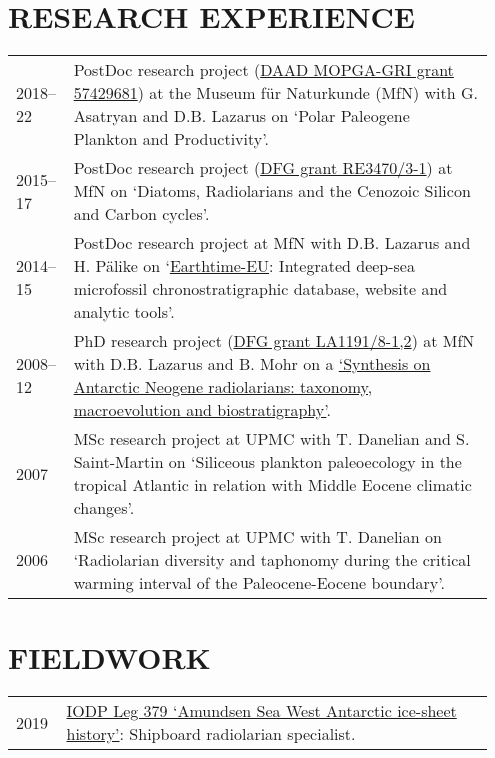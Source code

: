 \documentclass[11pt, a4paper]{article}
\begin{document}
\section{RESEARCH EXPERIENCE}
\begin{longtable}{@{}p{0.1\linewidth} P{0.85\linewidth}@{}}
2018--22 & PostDoc research project (\href{https://www.daad.de/medien/hochschulen/regional/europa/mopga/projektbeschreibungen_englisch_15-05-2018.pdf}{DAAD MOPGA-GRI grant 57429681}) at the Museum f\"{u}r Naturkunde (MfN) with G. Asatryan and D.B. Lazarus on `Polar Paleogene Plankton and Productivity'.\\
2015--17 & PostDoc research project (\href{http://gepris.dfg.de/gepris/projekt/279867559}{DFG grant RE3470/3-1}) at MfN on `Diatoms, Radiolarians and the Cenozoic Silicon and Carbon cycles'.\\
2014--15 & PostDoc research project at MfN with D.B. Lazarus and H. P\"{a}like on `\href{http://earthtime-eu.eu/earthtime/?page_id=686}{Earthtime-EU}: Integrated deep-sea microfossil chronostratigraphic database, website and analytic tools'.\\
2008--12 & PhD research project (\href{http://gepris.dfg.de/gepris/projekt/84744046}{DFG grant LA1191/8-1,2}) at MfN with D.B. Lazarus and B. Mohr on a \href{https://doi.org/10.18452/16985}{`Synthesis on Antarctic Neogene radiolarians: taxonomy, macroevolution and biostratigraphy'}.\\
2007 & MSc research project at UPMC with T. Danelian and S. Saint-Martin on `Siliceous plankton paleoecology in the tropical Atlantic in relation with Middle Eocene climatic changes'.\\
2006 & MSc research project at UPMC with T. Danelian on `Radiolarian diversity and taphonomy during the critical warming interval of the Paleocene-Eocene boundary'.\\
\end{longtable}

\section{FIELDWORK}
\begin{longtable}{@{}p{0.1\linewidth} P{0.85\linewidth}@{}}
2019 & \href{https://iodp.tamu.edu/scienceops/expeditions/amundsen_sea_ice_sheet_history.html}{IODP Leg 379 `Amundsen Sea West Antarctic ice-sheet history'}: Shipboard radiolarian specialist.\\
\end{longtable}
\end{document}
